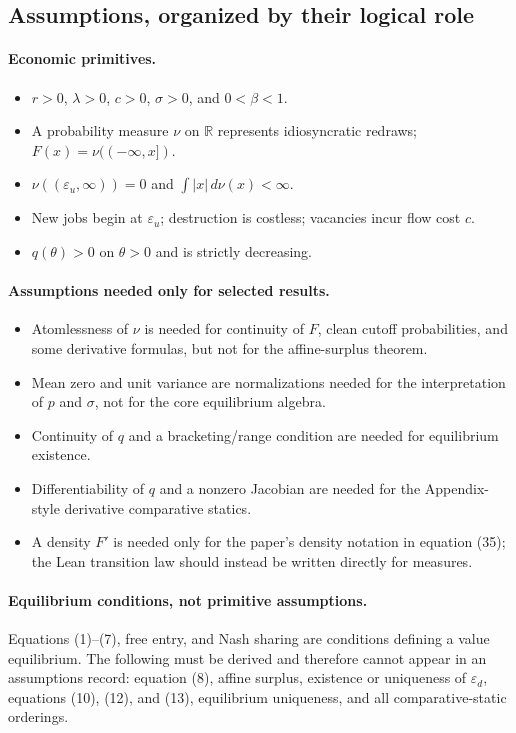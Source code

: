 \documentclass[11pt]{article}
\newcommand{\epsd}{\varepsilon_d}
\newcommand{\epsu}{\varepsilon_u}
\newcommand{\R}{\mathbb{R}}
\begin{document}
\subsection{Assumptions, organized by their logical role}

\paragraph{Economic primitives.}
\begin{itemize}
\item $r>0$, $\lambda>0$, $c>0$, $\sigma>0$, and $0<\beta<1$.
\item A probability measure $\nu$ on $\R$ represents idiosyncratic redraws; $F(x)=\nu(( -\infty,x])$.
\item $\nu((\epsu,\infty))=0$ and $\int |x|\,d\nu(x)<\infty$.
\item New jobs begin at $\epsu$; destruction is costless; vacancies incur flow cost $c$.
\item $q(\theta)>0$ on $\theta>0$ and is strictly decreasing.
\end{itemize}

\paragraph{Assumptions needed only for selected results.}
\begin{itemize}
\item Atomlessness of $\nu$ is needed for continuity of $F$, clean cutoff probabilities, and some derivative formulas, but not for the affine-surplus theorem.
\item Mean zero and unit variance are normalizations needed for the interpretation of $p$ and $\sigma$, not for the core equilibrium algebra.
\item Continuity of $q$ and a bracketing/range condition are needed for equilibrium existence.
\item Differentiability of $q$ and a nonzero Jacobian are needed for the Appendix-style derivative comparative statics.
\item A density $F'$ is needed only for the paper's density notation in equation (35); the Lean transition law should instead be written directly for measures.
\end{itemize}

\paragraph{Equilibrium conditions, not primitive assumptions.}
Equations (1)--(7), free entry, and Nash sharing are conditions defining a value equilibrium. The following must be derived and therefore cannot appear in an assumptions record: equation (8), affine surplus, existence or uniqueness of $\epsd$, equations (10), (12), and (13), equilibrium uniqueness, and all comparative-static orderings.
\end{document}
